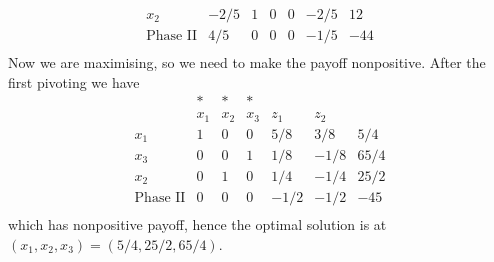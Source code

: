 \begin{example}
$$\begin{array}{c|ccccc|c}
        x_2&-2/5&1&0&0&-2/5&12\\ \hline
        \text{Phase II}&4/5&0&0&0&-1/5&-44\\
    \end{array}$$
    Now we are maximising, so we need to make the payoff nonpositive.
    After the first pivoting we have
    $$\begin{array}{c|ccccc|c}
        &\ast&\ast&\ast&&&\\
        &x_1&x_2&x_3&z_1&z_2&\\ \hline
        x_1&1&0&0&5/8&3/8&5/4\\
        x_3&0&0&1&1/8&-1/8&65/4\\
        x_2&0&1&0&1/4&-1/4&25/2\\ \hline
        \text{Phase II}&0&0&0&-1/2&-1/2&-45\\
    \end{array}$$
    which has nonpositive payoff, hence the optimal solution is at $(x_1,x_2,x_3)=(5/4,25/2,65/4)$.
\end{example}